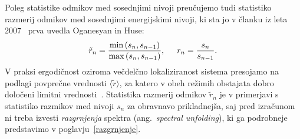  Poleg statistike odmikov med sosednjimi nivoji 
 preučujemo tudi statistiko razmerij odmikov med sosednjimi energijskimi nivoji, ki sta jo v članku iz leta 2007~\cite{PhysRevB.75.155111} prva uvedla Oganesyan in Huse:
 \begin{equation}\label{eq:oganesyan_huse}
 \tilde{r}_n=\frac{\min\left(s_n,s_{n-1}\right)}{\max\left(s_n,s_{n-1}\right)}, \hspace{5mm} r_n=\frac{s_n}{s_{n-1}}.
 \end{equation}
 V praksi ergodičnost oziroma večdelčno lokaliziranost sistema presojamo na podlagi povprečne vrednosti $\langle \tilde{r}\rangle$, za katero v obeh režimih obstajata dobro določeni limitni vrednosti~\cite{Atas_Distribution_PhysRevLett.110.084101}. Statistika razmerij odmikov $\tilde{r}_n$ je v primerjavi s statistiko razmikov med nivoji $s_n$ za obravnavo prikladnejša, saj pred izračunom ni treba izvesti \emph{razgrnjenja} spektra (ang.~\emph{spectral unfolding}), ki ga podrobneje predstavimo v poglavju~\ref{razgrnjenje}.

